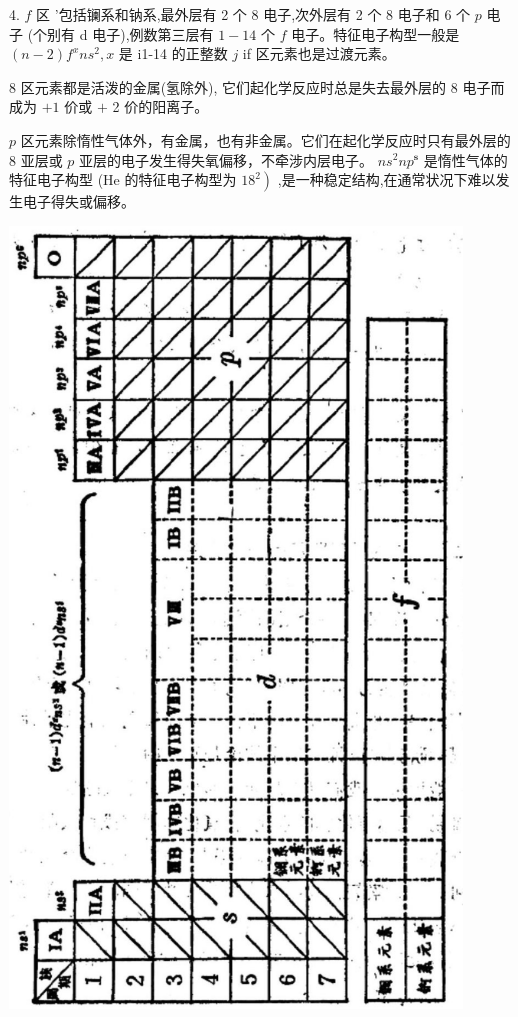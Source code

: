 \documentclass[10pt]{article}
\begin{document}
4. \(f\) 区 ’包括镧系和钠系,最外层有 2 个 8 电子,次外层有 2 个 8 电子和 6 个 \(p\) 电子 (个别有 d 电子),例数第三层有 \(1 - {14}\) 个 \(f\) 电子。特征电子构型一般是 \(\left( {n - 2}\right) {f}^{x}n{s}^{2},x\) 是 i1-14 的正整数 \(j\) if 区元素也是过渡元素。

8 区元素都是活泼的金属(氢除外), 它们起化学反应时总是失去最外层的 8 电子而成为 \(+ 1\) 价或 \(+\) 2 价的阳离子。

\(p\) 区元素除惰性气体外，有金属，也有非金属。它们在起化学反应时只有最外层的 8 亚层或 \(p\) 亚层的电子发生得失氧偏移，不牵涉内层电子。 \(n{s}^{2}n{p}^{\mathbf{s}}\) 是惰性气体的特征电子构型 (He 的特征电子构型为 \(\left. {18}^{2}\right)\) ,是一种稳定结构,在通常状况下难以发生电子得失或偏移。

\begin{center}
\includegraphics[max width=0.9\textwidth]{images/01912d0f-097c-7e75-8f32-4f326cd86c9f_130_835838.jpg}
\end{center}
\end{document}
